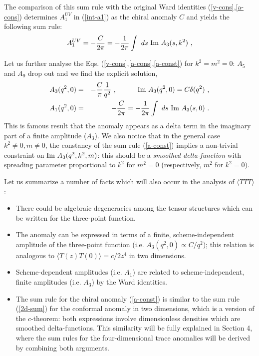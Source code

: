 \documentclass[11pt]{article}
\newcommand{\beq}{\begin{equation}}
\newcommand{\eeq}{\end{equation}}
\newcommand{\bea}{\begin{eqnarray}}
\newcommand{\eea}{\end{eqnarray}}
\def\Im{\hbox{\rm Im\ }}
\def\nl{\nonumber\\}
\def\bra{\langle}
\def\ket{\rangle}
\begin{document}
The comparison of this sum rule with the original Ward identities
(\ref{v-cons},\ref{a-cons}) determines $A_1^{UV}$
in (\ref{int-a1}) as the chiral anomaly $C$ and yields the following
sum rule:
\beq\label{a-const} 
A_1^{UV} = - {C \over 2\pi} = - {1 \over 2\pi} \int \ ds\  
\Im A_3(s,k^2)\ ,   
\eeq 

Let us further analyse the Eqs.
(\ref{v-cons},\ref{a-cons},\ref{a-const}) for $k^2=m^2=0$:
$A_5$ and $A_9$ drop out and we find the explicit solution,
\bea\label{chi-sol} 
A_3(q^2,0) &=& -{ C \over \pi}{1\over q^2} \ , \qquad\quad  
\Im A_3(q^2,0)= C \delta(q^2)\ , \nl 
A_1(q^2,0) &=& - {C \over 2\pi} = - {1 \over 2\pi} \int \ ds\  
\Im A_3(s,0) \ . 
\eea 
This is famous result \cite{fsby} that the anomaly appears as
a delta term in the imaginary part of a finite amplitude 
($A_3$).
We also notice that in the general case
$k^2\neq 0, m \neq 0$, the constancy of the sum rule (\ref{a-const})
implies a non-trivial constraint on $\Im A_3(q^2,k^2,m)$:
this should be a {\it smoothed delta-function }
with spreading parameter proportional to $k^2$ for $m^2=0$
(respectively, $m^2$ for $k^2=0$). 

Let us summarize a number of facts which will  
also occur in the analysis of $\bra TTT \ket$: 
\begin{itemize} 
\item  
There could be algebraic degeneracies among the tensor structures  
which can be written for the three-point function. 
\item 
The anomaly can be expressed in terms of  
a finite, scheme-independent amplitude of the three-point function  
(i.e. $ A_3(q^2,0) \propto C/q^2$); this relation is analogous to 
$\bra T(z)T(0)\ket =c/2z^4$ in two dimensions.
\item 
Scheme-dependent amplitudes (i.e. $A_1$) are related to scheme-independent,
finite amplitudes (i.e. $A_3$) by the Ward identities. 
\item
The sum rule for the chiral anomaly (\ref{a-const}) is similar 
to the sum rule (\ref{2d-sum}) for the conformal anomaly in two dimensions,
which is a version of the $c$-theorem: both expressions
involve dimensionless densities which are smoothed delta-functions.
This similarity will be fully explained
in Section 4, where the sum rules for the four-dimensional
trace anomalies will be derived by combining both arguments.
\end{itemize} 

 
\end{document}
